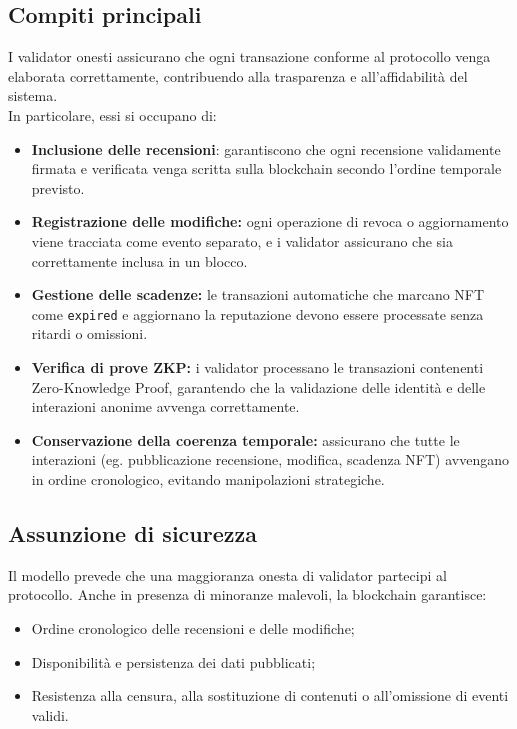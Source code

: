         \subsection{Compiti principali}
            I validator onesti assicurano che ogni transazione conforme al protocollo venga elaborata correttamente, contribuendo alla trasparenza e all'affidabilità del sistema.\\
            In particolare, essi si occupano di:
                \begin{itemize}
                    \item \textbf{Inclusione delle recensioni}: garantiscono che ogni recensione validamente firmata e verificata venga scritta sulla blockchain secondo l'ordine temporale previsto.
                    
                    \item \textbf{Registrazione delle modifiche:} ogni operazione di revoca o aggiornamento viene tracciata come evento separato, e i validator assicurano che sia correttamente inclusa in un blocco.
                    
                    \item  \textbf{Gestione delle scadenze:} le transazioni automatiche che marcano NFT come \texttt{expired} e aggiornano la reputazione devono essere processate senza ritardi o omissioni.

                    \item \textbf{Verifica di prove ZKP:} i validator processano le transazioni contenenti Zero-Knowledge Proof, garantendo che la validazione delle identità e delle interazioni anonime avvenga correttamente.
                        
                    \item \textbf{Conservazione della coerenza temporale:} assicurano che tutte le interazioni (eg. pubblicazione recensione, modifica, scadenza NFT) avvengano in ordine cronologico, evitando manipolazioni strategiche.
                \end{itemize}

        \subsection{Assunzione di sicurezza}
            Il modello prevede che una maggioranza onesta di validator partecipi al protocollo. Anche in presenza di minoranze malevoli, la blockchain garantisce:
                \begin{itemize}
                    \item Ordine cronologico delle recensioni e delle modifiche;
                    \item Disponibilità e persistenza dei dati pubblicati;
                    \item Resistenza alla censura, alla sostituzione di contenuti o all'omissione di eventi validi.
                \end{itemize}
        
